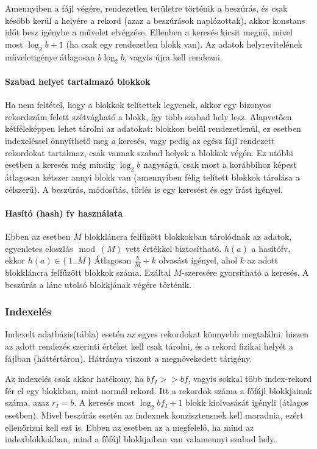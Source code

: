 \documentclass[fleqn,10pt,a4paper]{article}
\theoremstyle{magyar}
\begin{document}
  Amennyiben a fájl végére, rendezetlen területre történik a beszúrás, és csak később kerül a helyére a rekord (azaz a
  beszúrások naplózottak), akkor konstans időt besz igénybe a művelet elvégzése. Ellenben a keresés kicsit megnő, mivel
  most $\log_2b + 1$  (ha csak egy rendezetlen blokk van). Az adatok helyrevitelének műveletigénye átlagosan $b\log_2b$,
  vagyis újra kell rendezni.

  \paragraph{Szabad helyet tartalmazó blokkok} Ha nem feltétel, hogy a blokkok telítettek legyenek, akkor egy bizonyos
  rekordszám felett szétvágható a blokk, így több szabad hely lesz. Alapvetően kétféleképpen lehet tárolni az adatokat:
  blokkon belül rendezetlenül, ez esetben indexeléssel önnyíthető meg a keresés, vagy pedig az egész fájl rendezett
  rekordokat tartalmaz, csak vannak szabad helyek a blokkok végén. Ez utóbbi esetben a keresés még mindig $\log_2b$
  nagyságú, csak most a korábbihoz képest átlagosan kétszer annyi blokk van (amennyiben félig telített blokkok tárolása
  a célszerű). A beszúrás, módosítás, törlés is egy keresést és egy írást igényel.

  \paragraph{Hasító (hash) fv használata} Ebben az esetben $M$ blokkláncra felfűzött blokkokban tárolódnak az adatok,
  egyenletes eloszlás$\mod(M)$ vett értékkel biztosítható. $h(a)$ a hasítófv, ekkor $h(a)\in\{\,1..M\,\}$ Átlagosan
  $\frac{b}{M} +k$ olvasást igényel, ahol $k$ az adott blokkláncra felfűzött blokkok száma. Ezáltal $M$-szeresére
  gyorsítható a keresés. A beszúrás a lánc utolsó blokkjának végére történik.

  \subsubsection{Indexelés} Indexelt adatbázis(tábla) esetén az egyes rekordokat könnyebb megtalálni, hiszen az adott
  rendezés szerinti értéket kell csak tárolni, és a rekord fizikai helyét a fájlban (háttértáron). Hátránya viszont a
  megnövekedett tárigény.

  Az indexelés csak akkor hatékony, ha $bf_I >> bf$, vagyis sokkal több index-rekord fér el egy blokkban, mint normál
  rekord. Itt a rekordok száma a főfájl blokkjainak száma, azaz $r_I = b$. A keresés most $\log_2{bf_I} + 1$ blokk
  kiolvasását igényli (átlagos esetben). Mivel beszúrás esetén az indexnek konzisztensnek kell maradnia, ezért
  ellenőrizni kell ezt is. Ebben az esetben az a megfelelő, ha mind az indexblokkokban, mind a főfájl blokkjaiban van
  valamennyi szabad hely.
\end{document}
